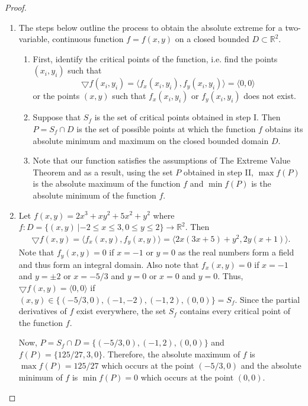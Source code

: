 \documentclass[12pt]{article}
\theoremstyle{definition}
\begin{document}
\begin{proof}
  \begin{enumerate}
    \item The steps below outline the process to obtain the absolute extreme for
      a two-variable, continuous function $f = f(x, y)$ on a closed bounded $D \subset \mathbb{R}^2$.
      \begin{enumerate}[label=\Roman*.]
        \item First, identify the critical points of the function, i.e. find the points
          $(x_i, y_i)$ such that $$\bigtriangledown f(x_i, y_i) = \langle f_x(x_i, y_i), f_y(x_i, y_i) \rangle = \langle 0, 0 \rangle$$
          or the points $(x, y)$ such that $f_x(x_i, y_i)$ or $f_y(x_i, y_i)$ does not exist.
        \item Suppose that $S_f$ is the set of critical points obtained in step I. Then
          $P = S_f \cap D$ is the set of possible points at which
          the function $f$ obtains its absolute minimum and maximum on the closed bounded domain $D$.
        \item Note that our function satisfies
          the assumptions of The Extreme Value Theorem and as a result, using the set $P$ obtained in step II,
          $\max{f(P)}$ is the absolute maximum of the function $f$
          and $\min{f(P)}$ is the absolute minimum of the function $f$.
      \end{enumerate}
    \item Let $f(x, y) = 2x^3 + xy^2 + 5x^2 + y^2$ where $f: D = \{(x, y)\ | -2 \leq x \leq 3, 0 \leq y \leq 2\} \to \mathbb{R}^2$. Then
      \begin{align*}
        \bigtriangledown f(x, y) = \langle f_x(x, y), f_y(x, y) \rangle = \langle 2x(3x + 5) + y^2, 2y(x + 1)\rangle.
      \end{align*}
      Note that $f_y(x,y) = 0$ if $x = -1$ or $y = 0$ as the real numbers form a field and thus form an integral domain.
      Also note that $f_x(x, y) = 0$ if $x = -1$ and $y = \pm 2$ or $x = -5/3$ and $y = 0$ or $x = 0$ and $y = 0$. Thus,
      $\bigtriangledown f(x, y) = \langle 0, 0 \rangle$ if $(x, y) \in \{(-5/3, 0), (-1, -2), (-1, 2), (0, 0)\} = S_f$.  Since the partial derivatives
      of $f$ exist everywhere, the set $S_f$ contains every critical point of the function $f$.

      Now, $P = S_f \cap D = \{(-5/3, 0), (-1, 2), (0, 0)\}$ and $f(P) = \{125/27, 3, 0\}$. Therefore,
      the absolute maximum of $f$ is $\max{f(P)} = 125/27$ which occurs at the point $(-5/3, 0)$ and the absolute
      minimum of $f$ is $\min{f(P)} = 0$ which occurs at the point $(0, 0)$.
  \end{enumerate}
\end{proof}
\newpage
\end{document}

